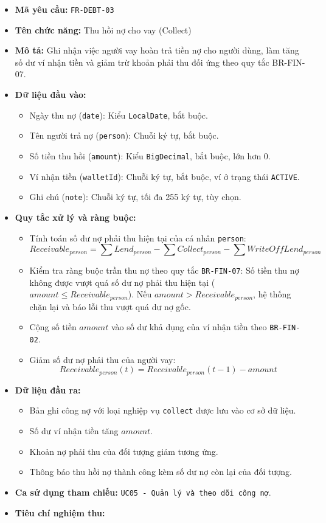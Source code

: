 \documentclass[11pt,a4paper]{article}
\providecommand{\tightlist}{
  \setlength{\itemsep}{0pt}\setlength{\parskip}{0pt}}
\begin{document}
\begin{itemize}
\tightlist
\item
  \textbf{Mã yêu cầu:} \texttt{FR-DEBT-03}
\item
  \textbf{Tên chức năng:} Thu hồi nợ cho vay (Collect)
\item
  \textbf{Mô tả:} Ghi nhận việc người vay hoàn trả tiền nợ cho người
  dùng, làm tăng số dư ví nhận tiền và giảm trừ khoản phải thu đối ứng
  theo quy tắc BR-FIN-07.
\item
  \textbf{Dữ liệu đầu vào:}

  \begin{itemize}
  \tightlist
  \item
    Ngày thu nợ (\texttt{date}): Kiểu \texttt{LocalDate}, bắt buộc.
  \item
    Tên người trả nợ (\texttt{person}): Chuỗi ký tự, bắt buộc.
  \item
    Số tiền thu hồi (\texttt{amount}): Kiểu \texttt{BigDecimal}, bắt
    buộc, lớn hơn 0.
  \item
    Ví nhận tiền (\texttt{walletId}): Chuỗi ký tự, bắt buộc, ví ở trạng
    thái \texttt{ACTIVE}.
  \item
    Ghi chú (\texttt{note}): Chuỗi ký tự, tối đa 255 ký tự, tùy chọn.
  \end{itemize}
\item
  \textbf{Quy tắc xử lý và ràng buộc:}

  \begin{itemize}
  \tightlist
  \item
    Tính toán số dư nợ phải thu hiện tại của cá nhân \texttt{person}:
    \[Receivable_{person} = \sum Lend_{person} - \sum Collect_{person} - \sum WriteOffLend_{person}\]
  \item
    Kiểm tra ràng buộc trần thu nợ theo quy tắc \texttt{BR-FIN-07}: Số
    tiền thu nợ không được vượt quá số dư nợ phải thu hiện tại
    (\(amount \le Receivable_{person}\)). Nếu
    \(amount > Receivable_{person}\), hệ thống chặn lại và báo lỗi thu
    vượt quá dư nợ gốc.
  \item
    Cộng số tiền \(amount\) vào số dư khả dụng của ví nhận tiền theo
    \texttt{BR-FIN-02}.
  \item
    Giảm số dư nợ phải thu của người vay:
    \[
    Receivable_{person}(t) = Receivable_{person}(t-1) - amount
    \]
  \end{itemize}
\item
  \textbf{Dữ liệu đầu ra:}

  \begin{itemize}
  \tightlist
  \item
    Bản ghi công nợ với loại nghiệp vụ \texttt{collect} được lưu vào cơ
    sở dữ liệu.
  \item
    Số dư ví nhận tiền tăng \(amount\).
  \item
    Khoản nợ phải thu của đối tượng giảm tương ứng.
  \item
    Thông báo thu hồi nợ thành công kèm số dư nợ còn lại của đối tượng.
  \end{itemize}
\item
  \textbf{Ca sử dụng tham chiếu:}
  \texttt{UC05\ -\ Quản\ lý\ và\ theo\ dõi\ công\ nợ}.
\item
  \textbf{Tiêu chí nghiệm thu:}


\end{itemize}
\end{document}
